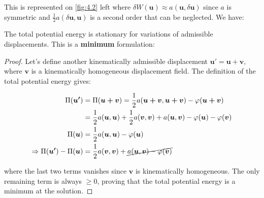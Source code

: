 	This is represented on \autoref{fig:4.2} left where $\delta W(\bm{u}) \approx a(\bm{u}, \delta \bm{u})$ since $a$ is symmetric and $\frac{1}{2}a(\delta \bm{u}, \bm{u})$ is a second order that can be neglected. We have:
	
	\begin{center}
	\end{center}
	
	The total potential energy is stationary for variations of admissible displacements. This is a \textbf{minimum} formulation:
	
	\begin{proof}
	Let's define another kinematically admissible displacement $\bm{u'= u+v},$ where $\bm{v}$ is a kinematically homogeneous displacement field. The definition of the total potential energy gives: 
	
	\begin{equation}
	\begin{aligned}
	\Pi (\bm{u'}) &= \Pi (\bm{u+v}) = \frac{1}{2} a(\bm{u+v},\bm{u+v}) - \varphi (\bm{u+v})\\ 
	&= \frac{1}{2} a(\bm{u},\bm{u}) + \frac{1}{2} a(\bm{v}, \bm{v}) + a(\bm{u},\bm{v}) - \varphi (\bm{u}) - \varphi (\bm{v})\\
	\Pi(\bm{u}) &= \frac{1}{2} a(\bm{u},\bm{u}) - \varphi (\bm{u})\\
	\Rightarrow \Pi (\bm{u'}) -\Pi(\bm{u}) &=  \frac{1}{2} a(\bm{v}, \bm{v}) + \cancel{a(\bm{u},\bm{v}) - \varphi (\bm{v})} 
	\end{aligned}
	\end{equation}
	
	where the last two terms vanishes since $\bm{v}$ is kinematically homogeneous. The only remaining term is always $\geq 0$, proving that the total potential energy is a minimum at the solution.
	\end{proof}
	